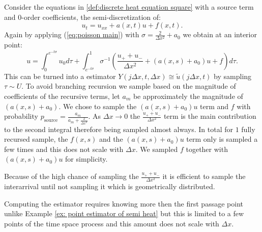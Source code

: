 \documentclass[a4paper,12pt]{article}
\begin{document}
\begin{example} \label{ex:semi heat source}

  Consider the equations in \ref{def:discrete heat equation square} with a source term and $0$-order coefficients, the
  semi-discretization of:
  \begin{equation}
    u_{t} = u_{xx} + a(x,t)u + f(x,t)
    .
  \end{equation}
  Again by applying (\ref{eq:poisson main}) with $\sigma = \frac{2}{\Delta x^{2}} +a_{0}$
  we obtain at an interior point:
  \begin{equation} \label{eq:int semi heat source}
    u =
    \int_{0}^{e^{-t \sigma }} u_{0} d\tau  + \int_{e^{-t \sigma }}^{1}
    \sigma^{-1}
    \left(
    \frac{u_{+} + u_{-}}{\Delta x^{2}} +(a(x,s)+ a_{0}) u+ f
    \right)
    d\tau
    .
  \end{equation}
  This can be turned into a estimator $Y(j \Delta x,t,\Delta x ) \cong  \tilde{u}(j \Delta x,t)$
  by sampling $\tau \sim U$.
  To avoid branching recursion we sample
  based on the magnitude of coefficients of the recursive terms, let $a_m$ be approximately the magnitude of
  $(a(x,s)+ a_{0})$. We chose to sample the $(a(x,s)+ a_{0})u$ term and $f$
  with probability $p_{\text{source}} = \frac{a_m}{a_m + \frac{2}{\Delta x^{2}}}$.
  As $\Delta x \rightarrow 0$ the $\frac{u_{+} + u_{-}}{\Delta x^{2}}$ term is
  the main contribution to the second integral therefore
  being sampled almost always.
  In total for $1$ fully recursed sample,
  the $f(x,s)$ and the $(a(x,s)+ a_{0})u$ term only
  is sampled a few times and this does not scale with $\Delta x$. We
  sampled $f$ together with $(a(x,s)+ a_{0})u$ for simplicity.
\end{example}

\begin{julia}\label{jl:point estimator heat source}
  Because of the high chance of sampling the $\frac{u_{+} + u_{-}}{\Delta x^{2}}$ it is efficient
  to sample the interarrival until not sampling it which is geometrically distributed.

\end{julia}

Computing the estimator requires knowing more then the first passage point
unlike Example \ref{ex: point estimator of semi heat} but this is limited
to a few points of the time space process and this amount does not scale with $\Delta x$.
\end{document}
